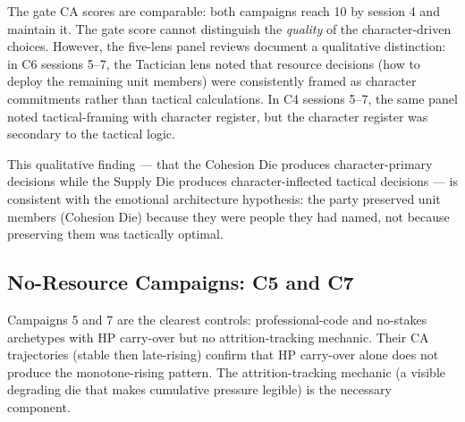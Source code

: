 The gate CA scores are comparable: both campaigns reach 10 by session 4 and maintain
it. The gate score cannot distinguish the \textit{quality} of the character-driven choices.
However, the five-lens panel reviews document a qualitative distinction: in C6 sessions
5--7, the Tactician lens noted that resource decisions (how to deploy the remaining unit
members) were consistently framed as character commitments rather than tactical
calculations. In C4 sessions 5--7, the same panel noted tactical-framing with character
register, but the character register was secondary to the tactical logic.

This qualitative finding --- that the Cohesion Die produces character-primary decisions
while the Supply Die produces character-inflected tactical decisions --- is consistent
with the emotional architecture hypothesis: the party preserved unit members (Cohesion
Die) because they were people they had named, not because preserving them was
tactically optimal.

\subsection{No-Resource Campaigns: C5 and C7}

Campaigns 5 and 7 are the clearest controls: professional-code and no-stakes archetypes
with HP carry-over but no attrition-tracking mechanic. Their CA trajectories (stable then
late-rising) confirm that HP carry-over alone does not produce the monotone-rising
pattern. The attrition-tracking mechanic (a visible degrading die that makes cumulative
pressure legible) is the necessary component.
